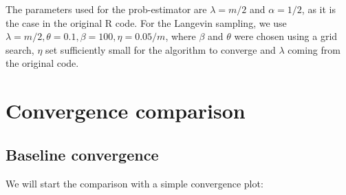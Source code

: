 \documentclass[12pt]{memoir}
\begin{document}
The parameters used for the prob-estimator are $\lambda=m/2$ and $\alpha=1/2$, as it is the case in the original R code. For the Langevin sampling, we use $\lambda=m/2,\theta=0.1,\beta=100,\eta=0.05/m$, where $\beta$ and $\theta$ were chosen using a grid search, $\eta$ set sufficiently small for the algorithm to converge and $\lambda$ coming from the original code.


\section{Convergence comparison}\label{section:convergence-comparison}


\subsection*{Baseline convergence}


We will start the comparison with a simple convergence plot:
\end{document}
